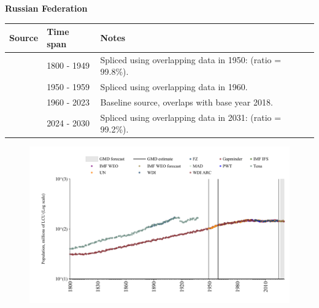 \documentclass[12pt,a4paper,landscape]{article}
\begin{document}
\begin{adjustbox}{max totalsize={\paperwidth}{\paperheight},center}
\begin{minipage}[t][\textheight][t]{\textwidth}
\vspace*{0.5cm}
{}
\begin{center}
{\Large\bfseries Russian Federation}
\end{center}
\vspace{0.5cm}
\begin{table}[H]
\centering
\small
\begin{tabular}{|l|l|l|}
\hline
\textbf{Source} & \textbf{Time span} & \textbf{Notes} \\
\hline
\rowcolor{white}\cite{Gapminder}& 1800 - 1949 &Spliced using overlapping data in 1950: (ratio = 99.8\%).\\
\rowcolor{lightgray}\cite{IMF_IFS}& 1950 - 1959 &Spliced using overlapping data in 1960.\\
\rowcolor{white}\cite{WDI}& 1960 - 2023 &Baseline source, overlaps with base year 2018.\\
\rowcolor{lightgray}\cite{Gapminder}& 2024 - 2030 &Spliced using overlapping data in 2031: (ratio = 99.2\%).\\
\hline
\end{tabular}
\end{table}
\begin{figure}[H]
\centering
\includegraphics[width=\textwidth,height=0.6\textheight,keepaspectratio]{graphs/RUS_pop.pdf}
\end{figure}
\end{minipage}
\end{adjustbox}
\end{document}
